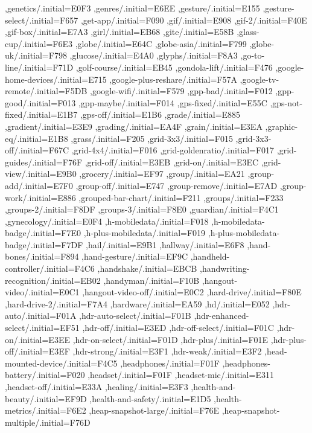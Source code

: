 { ,genetics/.initial=E0F3
 ,genres/.initial=E6EE
 ,gesture/.initial=E155
 ,gesture-select/.initial=F657
 ,get-app/.initial=F090
 ,gif/.initial=E908
 ,gif-2/.initial=F40E
 ,gif-box/.initial=E7A3
 ,girl/.initial=EB68
 ,gite/.initial=E58B
 ,glass-cup/.initial=F6E3
 ,globe/.initial=E64C
 ,globe-asia/.initial=F799
 ,globe-uk/.initial=F798
 ,glucose/.initial=E4A0
 ,glyphs/.initial=F8A3
 ,go-to-line/.initial=F71D
 ,golf-course/.initial=EB45
 ,gondola-lift/.initial=F476
 ,google-home-devices/.initial=E715
 ,google-plus-reshare/.initial=F57A
 ,google-tv-remote/.initial=F5DB
 ,google-wifi/.initial=F579
 ,gpp-bad/.initial=F012
 ,gpp-good/.initial=F013
 ,gpp-maybe/.initial=F014
 ,gps-fixed/.initial=E55C
 ,gps-not-fixed/.initial=E1B7
 ,gps-off/.initial=E1B6
 ,grade/.initial=E885
 ,gradient/.initial=E3E9
 ,grading/.initial=EA4F
 ,grain/.initial=E3EA
 ,graphic-eq/.initial=E1B8
 ,grass/.initial=F205
 ,grid-3x3/.initial=F015
 ,grid-3x3-off/.initial=F67C
 ,grid-4x4/.initial=F016
 ,grid-goldenratio/.initial=F017
 ,grid-guides/.initial=F76F
 ,grid-off/.initial=E3EB
 ,grid-on/.initial=E3EC
 ,grid-view/.initial=E9B0
 ,grocery/.initial=EF97
 ,group/.initial=EA21
 ,group-add/.initial=E7F0
 ,group-off/.initial=E747
 ,group-remove/.initial=E7AD
 ,group-work/.initial=E886
 ,grouped-bar-chart/.initial=F211
 ,groups/.initial=F233
 ,groups-2/.initial=F8DF
 ,groups-3/.initial=F8E0
 ,guardian/.initial=F4C1
 ,gynecology/.initial=E0F4
 ,h-mobiledata/.initial=F018
 ,h-mobiledata-badge/.initial=F7E0
 ,h-plus-mobiledata/.initial=F019
 ,h-plus-mobiledata-badge/.initial=F7DF
 ,hail/.initial=E9B1
 ,hallway/.initial=E6F8
 ,hand-bones/.initial=F894
 ,hand-gesture/.initial=EF9C
 ,handheld-controller/.initial=F4C6
 ,handshake/.initial=EBCB
 ,handwriting-recognition/.initial=EB02
 ,handyman/.initial=F10B
 ,hangout-video/.initial=E0C1
 ,hangout-video-off/.initial=E0C2
 ,hard-drive/.initial=F80E
 ,hard-drive-2/.initial=F7A4
 ,hardware/.initial=EA59
 ,hd/.initial=E052
 ,hdr-auto/.initial=F01A
 ,hdr-auto-select/.initial=F01B
 ,hdr-enhanced-select/.initial=EF51
 ,hdr-off/.initial=E3ED
 ,hdr-off-select/.initial=F01C
 ,hdr-on/.initial=E3EE
 ,hdr-on-select/.initial=F01D
 ,hdr-plus/.initial=F01E
 ,hdr-plus-off/.initial=E3EF
 ,hdr-strong/.initial=E3F1
 ,hdr-weak/.initial=E3F2
 ,head-mounted-device/.initial=F4C5
 ,headphones/.initial=F01F
 ,headphones-battery/.initial=F020
 ,headset/.initial=F01F
 ,headset-mic/.initial=E311
 ,headset-off/.initial=E33A
 ,healing/.initial=E3F3
 ,health-and-beauty/.initial=EF9D
 ,health-and-safety/.initial=E1D5
 ,health-metrics/.initial=F6E2
 ,heap-snapshot-large/.initial=F76E
 ,heap-snapshot-multiple/.initial=F76D
}
